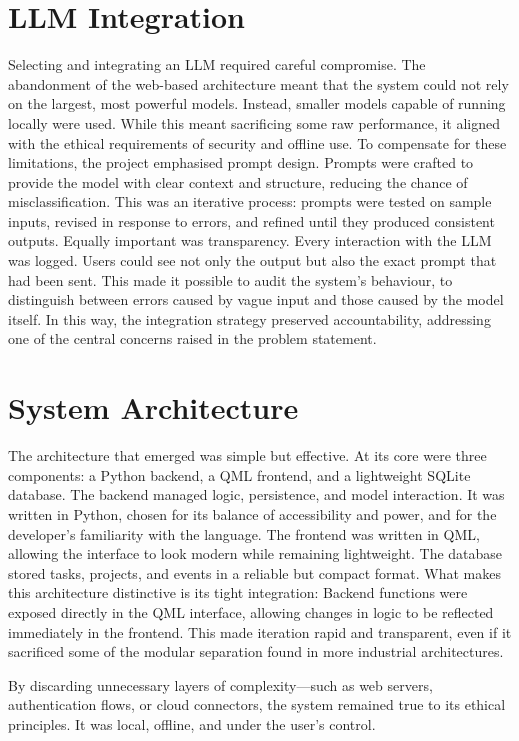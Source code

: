 \documentclass{report}
\begin{document}
\section{LLM Integration}

Selecting and integrating an LLM required careful compromise. 
The abandonment of the web-based architecture meant that the system could not rely on the largest, most powerful models. 
Instead, smaller models capable of running locally were used. 
While this meant sacrificing some raw performance, it aligned with the ethical requirements of security and offline use.
To compensate for these limitations, the project emphasised prompt design. 
Prompts were crafted to provide the model with clear context and structure, reducing the chance of misclassification. 
This was an iterative process: prompts were tested on sample inputs, revised in response to errors, and refined until they produced consistent outputs.
Equally important was transparency. Every interaction with the LLM was logged. Users could see not only the output but also the exact prompt that had been sent. 
This made it possible to audit the system's behaviour, to distinguish between errors caused by vague input and those caused by the model itself. 
In this way, the integration strategy preserved accountability, addressing one of the central concerns raised in the problem statement.

\section{System Architecture}

The architecture that emerged was simple but effective. 
At its core were three components: a Python backend, a QML frontend, and a lightweight SQLite database.
The backend managed logic, persistence, and model interaction. 
It was written in Python, chosen for its balance of accessibility and power, and for the developer's familiarity with the language. 
The frontend was written in QML, allowing the interface to look modern while remaining lightweight. 
The database stored tasks, projects, and events in a reliable but compact format.
What makes this architecture distinctive is its tight integration: Backend functions were exposed directly in the QML interface, allowing changes in logic to be reflected immediately in the frontend. 
This made iteration rapid and transparent, even if it sacrificed some of the modular separation found in more industrial architectures.

By discarding unnecessary layers of complexity—such as web servers, authentication flows, or cloud connectors, the system remained true to its ethical principles. 
It was local, offline, and under the user's control.
\end{document}

